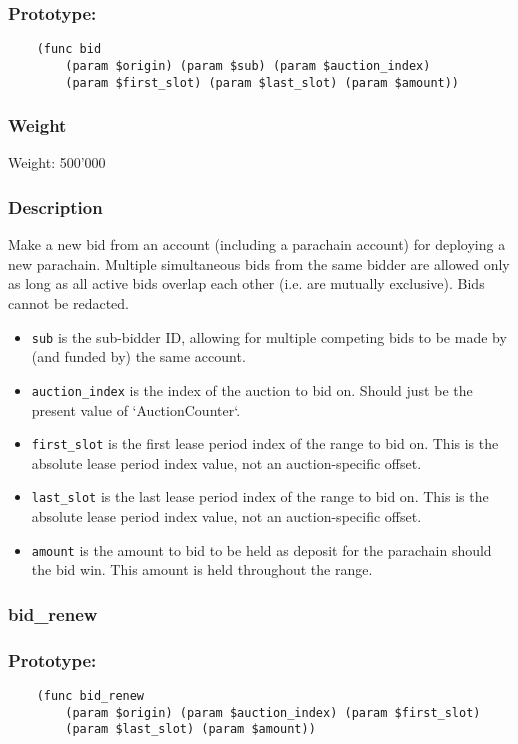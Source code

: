\documentclass[11pt,a4paper]{article}
\begin{document}
\subsubsection*{Prototype:}
\begin{verbatim}
    (func bid 
        (param $origin) (param $sub) (param $auction_index)
        (param $first_slot) (param $last_slot) (param $amount))
\end{verbatim}
\subsubsection*{Weight}
Weight: 500'000
\subsubsection*{Description}
Make a new bid from an account (including a parachain account) for deploying a new parachain. Multiple simultaneous bids from the same bidder are allowed only as long as all active bids overlap each other (i.e. are mutually exclusive). Bids cannot be redacted.

\begin{itemize}
\item \verb|sub| is the sub-bidder ID, allowing for multiple competing bids to be made by (and funded by) the same account.
\item \verb|auction_index| is the index of the auction to bid on. Should just be the present value of `AuctionCounter`.
\item \verb|first_slot| is the first lease period index of the range to bid on. This is the absolute lease period index value, not an auction-specific offset.
\item \verb|last_slot| is the last lease period index of the range to bid on. This is the absolute lease period index value, not an auction-specific offset.
\item \verb|amount| is the amount to bid to be held as deposit for the parachain should the bid win. This amount is held throughout the range.
\end{itemize}

\subsubsection{bid\_renew}
\subsubsection*{Prototype:}
\begin{verbatim}
    (func bid_renew
        (param $origin) (param $auction_index) (param $first_slot)
        (param $last_slot) (param $amount))
\end{verbatim}
\end{document}
